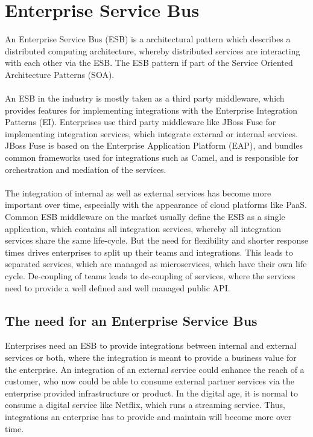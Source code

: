 \chapter{Enterprise Service Bus}
\label{cha:esb}
An Enterprise Service Bus (ESB) is a architectural pattern which describes a distributed computing architecture, whereby distributed services are interacting with each other via the ESB. The ESB pattern if part of the Service Oriented Architecture Patterns (SOA).   
\\ \\
An ESB in the industry is mostly taken as a third party middleware, which provides features for implementing integrations with the Enterprise Integration Patterns (EI). Enterprises use third party middleware like JBoss Fuse for implementing integration services, which integrate external or internal services. JBoss Fuse is based on the Enterprise Application Platform (EAP), and bundles common frameworks used for integrations such as Camel, and is responsible for orchestration and mediation of the services.
\\ \\
The integration of internal as well as external services has become more important over time, especially with the appearance of cloud platforms like PaaS. Common ESB middleware on the market usually define the ESB as a single application, which contains all integration services, whereby all integration services share the same life-cycle. But the need for flexibility and shorter response times drives enterprises to split up their teams and integrations. This leads to separated services, which are managed as microservices, which have their own life cycle. De-coupling of teams leads to de-coupling of services, where the services need to provide a well defined and well managed public API\cite{Camel2015, RedHatAgileIntegration2017, EIP}.

\section{The need for an Enterprise Service Bus}
\label{sec:esb-need-for-esb}
Enterprises need an ESB to provide integrations between internal and external services or both, where the integration is meant to provide a business value for the enterprise. An integration of an external service could enhance the reach of a customer, who now could be able to consume external partner services via the enterprise provided infrastructure or product. In the digital age, it is normal to consume a digital service like Netflix, which runs a streaming service. Thus, integrations an enterprise has to provide and maintain will become more over time.

